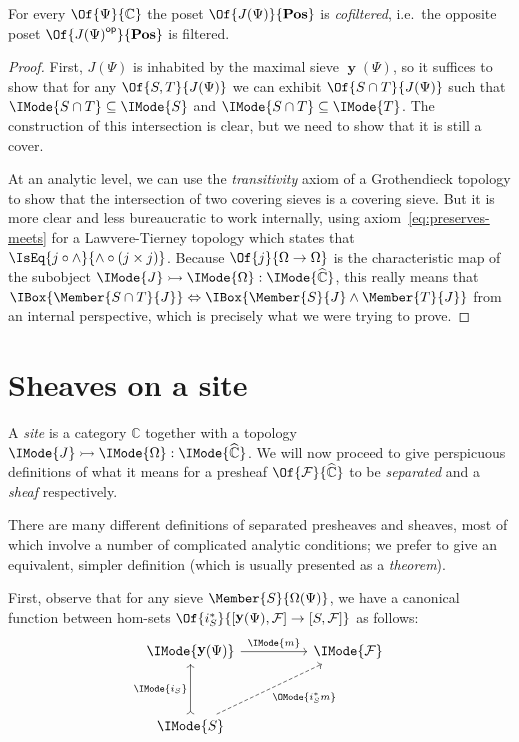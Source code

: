 \documentclass{article}
\newcommand\Posets{\mathbf{Pos}}
\newcommand\OpCat[1]{{{#1}^{\mathsf{op}}}}
\DeclareMathOperator\OpYoneda{\mathbf{y}}
\newcommand\Yoneda[1]{\OpYoneda({#1})}
\newcommand\Psh[1]{\widehat{#1}}
\newcommand\IsSubobject[3]{\IMode{#1}\rightarrowtail\IMode{#2}:\IMode{#3}}
\newcommand\IsSubsetEq[2]{\IMode{#1}\subseteq\IMode{#2}}
\begin{document}
\begin{lem}\label{lem:covering-sieves-filtered}
  For every $\Of{\Psi}{\mathbb{C}}$ the poset $\Of{J(\Psi)}{\Posets}$
  is \emph{cofiltered}, i.e.\ the opposite poset
  $\Of{\OpCat{J(\Psi)}}{\Posets}$ is filtered.
\end{lem}
\begin{proof}
  First, $J(\Psi)$ is inhabited by the maximal sieve $\Yoneda{\Psi}$,
  so it suffices to show that for any $\Of{S,T}{J(\Psi)}$ we can
  exhibit $\Of{S\cap T}{J(\Psi)}$ such that $\IsSubsetEq{S\cap T}{S}$
  and $\IsSubsetEq{S\cap T}{T}$. The construction of this intersection
  is clear, but we need to show that it is still a cover.

  At an analytic level, we can use the \emph{transitivity} axiom of a
  Grothendieck topology to show that the intersection of two covering
  sieves is a covering sieve. But it is more clear and less
  bureaucratic to work internally, using
  axiom~\ref{eq:preserves-meets} for a Lawvere-Tierney topology which
  states that $\IsEq{j\circ\land}{\land\circ(j\times j)}$.
%
  Because $\Of{j}{\Omega\to\Omega}$ is the characteristic map of the
  subobject $\IsSubobject{J}{\Omega}{\Psh{\mathbb{C}}}$, this really
  means that
  $\IBox{\Member{S\cap
      T}{J}}\Leftrightarrow\IBox{\Member{S}{J}\land\Member{T}{J}}$
  from an internal perspective, which is precisely what we were trying
  to prove.
\end{proof}

\section{Sheaves on a site}

A \emph{site} is a category $\mathbb{C}$ together with a topology
$\IsSubobject{J}{\Omega}{\Psh{\mathbb{C}}}$. We will now
proceed to give perspicuous definitions of what it means for a
presheaf $\Of{\mathcal{F}}{\Psh{\mathbb{C}}}$ to be \emph{separated} and a
\emph{sheaf} respectively.

There are many different definitions of separated presheaves and
sheaves, most of which involve a number of complicated analytic
conditions; we prefer to give an equivalent, simpler definition (which
is usually presented as a \emph{theorem}).

First, observe that for any sieve $\Member{S}{\Omega(\Psi)}$, we have
a canonical function between hom-sets
$\Of{i_S^*}{[\Yoneda{\Psi},\mathcal{F}]\to [S,\mathcal{F}]}$ as
follows:
\[
  \begin{tikzcd}[sep=huge]
    \IMode{\Yoneda{\Psi}}
    \arrow[r, "\IMode{m}"]
    &
    \IMode{\mathcal{F}}
    \\
    \IMode{S}
    \arrow[u,rightarrowtail,"\IMode{i_S}"]
    \arrow[ur,swap,dashed,"\OMode{i_S^*m}"]
  \end{tikzcd}
\]
\end{document}
